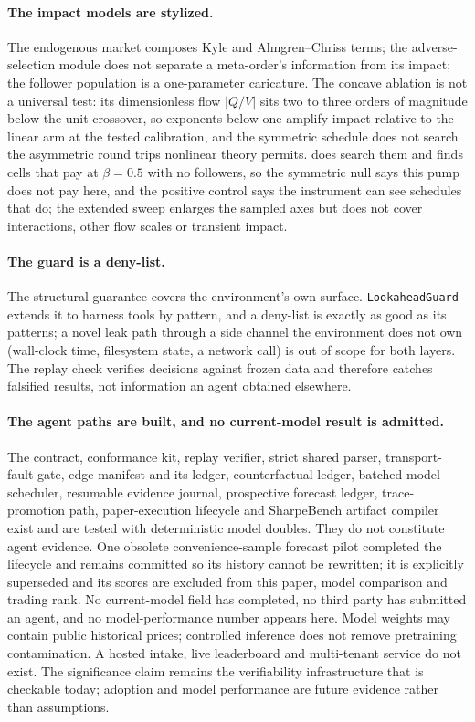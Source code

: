 \paragraph{The impact models are stylized.} The endogenous market composes Kyle and Almgren--Chriss terms; the adverse-selection module does not separate a meta-order's information from its impact; the follower population is a one-parameter caricature. The concave ablation is not a universal test: its dimensionless flow $|Q/V|$ sits two to three orders of magnitude below the unit crossover, so exponents below one amplify impact relative to the linear arm at the tested calibration, and the symmetric schedule does not search the asymmetric round trips nonlinear theory permits.  does search them and finds cells that pay at $\beta = 0.5$ with no followers, so the symmetric null says this pump does not pay here, and the positive control says the instrument can see schedules that do; the extended sweep enlarges the sampled axes but does not cover interactions, other flow scales or transient impact.

\paragraph{The guard is a deny-list.} The structural guarantee covers the environment's own surface. \texttt{LookaheadGuard} extends it to harness tools by pattern, and a deny-list is exactly as good as its patterns; a novel leak path through a side channel the environment does not own (wall-clock time, filesystem state, a network call) is out of scope for both layers. The replay check verifies decisions against frozen data and therefore catches falsified results, not information an agent obtained elsewhere.

\paragraph{The agent paths are built, and no current-model result is admitted.} The contract, conformance kit, replay verifier, strict shared parser, transport-fault gate, edge manifest and its ledger, counterfactual ledger, batched model scheduler, resumable evidence journal, prospective forecast ledger, trace-promotion path, paper-execution lifecycle and SharpeBench artifact compiler exist and are tested with deterministic model doubles. They do not constitute agent evidence. One obsolete convenience-sample forecast pilot completed the lifecycle and remains committed so its history cannot be rewritten; it is explicitly superseded and its scores are excluded from this paper, model comparison and trading rank. No current-model field has completed, no third party has submitted an agent, and no model-performance number appears here. Model weights may contain public historical prices; controlled inference does not remove pretraining contamination. A hosted intake, live leaderboard and multi-tenant service do not exist. The significance claim remains the verifiability infrastructure that is checkable today; adoption and model performance are future evidence rather than assumptions.

